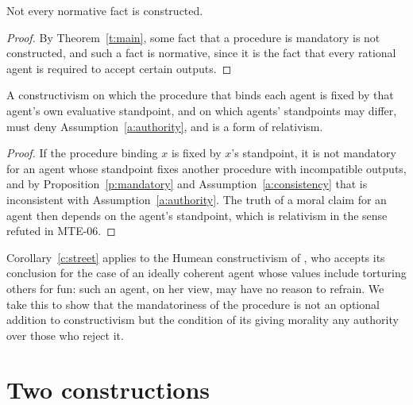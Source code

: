 \documentclass{situationist-preprint}
\begin{document}
\begin{corollary}\label{c:global}
Not every normative fact is constructed.
\end{corollary}

\begin{proof}
By Theorem~\ref{t:main}, some fact that a procedure is mandatory is not constructed, and such a fact is normative, since it is the fact that every rational agent is required to accept certain outputs.
\end{proof}

\begin{corollary}\label{c:street}
A constructivism on which the procedure that binds each agent is fixed by that agent's own evaluative standpoint, and on which agents' standpoints may differ, must deny Assumption~\ref{a:authority}, and is a form of relativism.
\end{corollary}

\begin{proof}
If the procedure binding $x$ is fixed by $x$'s standpoint, it is not mandatory for an agent whose standpoint fixes another procedure with incompatible outputs, and by Proposition~\ref{p:mandatory} and Assumption~\ref{a:consistency} that is inconsistent with Assumption~\ref{a:authority}. The truth of a moral claim for an agent then depends on the agent's standpoint, which is relativism in the sense refuted in MTE-06.
\end{proof}

Corollary~\ref{c:street} applies to the Humean constructivism of \citet{Street2008,Street2010}, who accepts its conclusion for the case of an ideally coherent agent whose values include torturing others for fun: such an agent, on her view, may have no reason to refrain. We take this to show that the mandatoriness of the procedure is not an optional addition to constructivism but the condition of its giving morality any authority over those who reject it.

\section{Two constructions}\label{s:cases}
\end{document}
